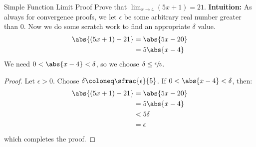 \begin{exbox}{Simple Function Limit Proof}{}
    Prove that $\lim_{x \to 4} (5x + 1) = 21$.
    \tcblower
    \textbf{Intuition:} As always for convergence proofs, we let $\epsilon$ be some arbitrary real number greater than $0$. Now we do some scratch work to find an appropriate $\delta$ value.
    \begin{align*}
        \abs{(5x+1)-21}
        &= \abs{5x-20} \\
        &= 5 \abs{x-4}
    \end{align*}
    We need $0 < \abs{x-4} < \delta$, so we choose $\delta \leq \sfrac{\epsilon}{5}$.

    \begin{proof}
        Let $\epsilon > 0$. Choose $\delta \coloneq \sfrac{\epsilon}{5}$. If $0 < \abs{x-4} < \delta$, then:
        \begin{align*}
            \abs{(5x+1) - 21}
            &= \abs{5x - 20} \\
            &= 5 \abs{x-4} \\
            &< 5\delta \\
            &= \epsilon
        \end{align*}
        which completes the proof.
    \end{proof}
\end{exbox}

